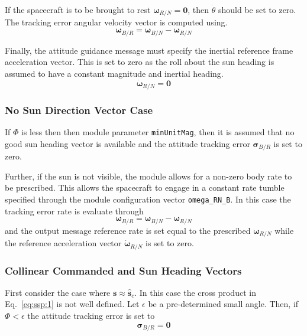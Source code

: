 If the spacecraft is to be brought to rest $\bm\omega_{R/N} = \bm 0$, then $\dot\theta$ should be set to zero.  The tracking error angular velocity vector is computed using.
\begin{equation}
	\label{eq:ssp:4}
	\bm\omega_{B/R} = \bm\omega_{B/N} - \bm\omega_{R/N}
\end{equation}

Finally, the attitude guidance message must specify the inertial reference frame  acceleration vector.  This is set to zero as the roll about the sun heading is assumed to have a constant magnitude and inertial heading.
\begin{equation}
	\dot{\bm \omega}_{R/N} = \bm 0
\end{equation}

\subsubsection{No Sun Direction Vector Case}
 If $\Phi$ is less then then module parameter {\tt minUnitMag}, then it is assumed that no good sun heading vector is available and the attitude tracking error $\bm\sigma_{B/R}$ is set to zero.   
 
 Further, if the sun is not visible, the module allows for a non-zero body rate to be prescribed.  This allows the spacecraft to engage in a constant rate tumble specified through the module configuration vector {\tt omega\_RN\_B}.  In this case the tracking error rate is evaluate through
 \begin{equation}
 	\label{eq:ssp:6}
	\bm\omega_{B/R} = \bm\omega_{B/N} - \bm\omega_{R/N}
 \end{equation}
 and the output message reference rate is set equal to the prescribed $\bm\omega_{R/N}$ while the reference acceleration vector $\dot{\bm \omega}_{R/N}$ is set to zero.

 
 \subsubsection{Collinear Commanded and Sun Heading Vectors}
First consider the case where $\bm s \approx \hat{\bm s}_{c}$.  In this case the cross product in Eq.~\eqref{eq:ssp:1} is not well defined.  Let $\epsilon$ be a pre-determined small angle.  Then, if $\Phi < \epsilon$ the attitude tracking error is set to 
$$
	\bm\sigma_{B/R} = \bm 0
$$
 
